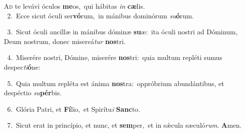 \lettrine{\initial\textcolor{\initialcolor}{A}}{d} te levávi óculos \textbf{me}\-os,~\star qui hábitas \textit{in} \textbf{cæ}\-lis.\\
{\numbfont\textcolor{\numbcolor}{~2.}}~Ecce sicut óculi ser\-\textbf{vó}\-rum,~\star in mánibus dominórum \textit{su}\-\textbf{ó}rum.\par
{\numbfont\textcolor{\numbcolor}{~3.}}~Sicut óculi ancíllæ in mánibus dóminæ \textbf{su}\-æ:~\star ita óculi nostri ad Dóminum, Deum nostrum, donec misereá\textit{tur} \textbf{nos}\-tri.\par
{\numbfont\textcolor{\numbcolor}{~4.}}~Miserére nostri, Dómine, miserére \textbf{nos}\-tri:~\star quia multum repléti sumus despec\-\textit{ti}\-\textbf{ó}ne:\par
{\numbfont\textcolor{\numbcolor}{~5.}}~Quia multum repléta est ánima \textbf{nos}\-tra:~\star oppróbrium abundántibus, et despéctio \textit{su}\-\textbf{pér}bis.\par
{\numbfont\textcolor{\numbcolor}{~6.}}~Glória Patri, et \textbf{Fí}\-lio,~\star et Spirítu\textit{i} \textbf{Sanc}\-to.\par
{\numbfont\textcolor{\numbcolor}{~7.}}~Sicut erat in princípio, et nunc, et \textbf{sem}\-per,~\star et in sǽcula sæculó\-\textit{rum}\-. \textbf{A}\-men.\par
